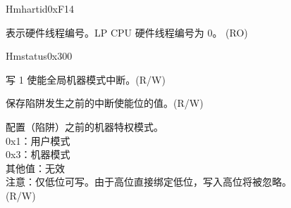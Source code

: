 \begin{register}{H}{mhartid}{0xF14}\label{regdesc:LPMHARTID}
%
\regnewline%
\begin{regdesc}\begin{reglist}
\label{fielddesc:LPMHARTID}\item [MHARTID] 表示硬件线程编号。LP CPU 硬件线程编号为 0。 (RO)
\end{reglist}\end{regdesc}
\end{register}

\begin{register}{H}{mstatus}{0x300}\label{regdesc:LPMSTATUS}
%
%
%
%
%
%
%
\regnewline%
\begin{regdesc}\begin{reglist}
\label{fielddesc:LPMSTATUSMIE}\item [MIE] 写 1 使能全局机器模式中断。(R/W)
\label{fielddesc:LPMSTATUSMPIE}\item [MPIE] 保存陷阱发生之前的中断使能位的值。(R/W)
\label{fielddesc:LPMSTATUSMPP}\item [MPP] 配置（陷阱）之前的机器特权模式。\\
0x1：用户模式\\
0x3：机器模式\\
其他值：无效\\
注意：仅低位可写。由于高位直接绑定低位，写入高位将被忽略。\\
(R/W)
\end{reglist}\end{regdesc}
\end{register}

